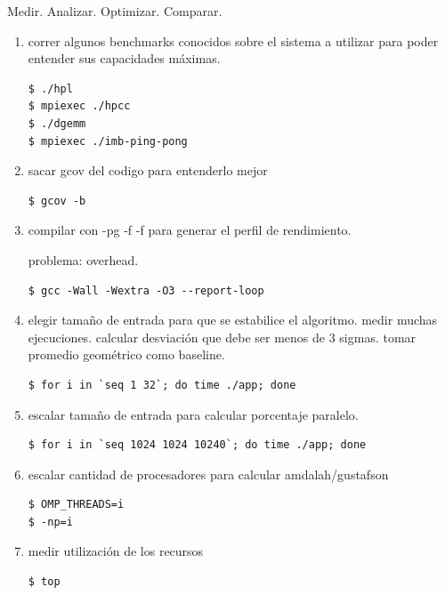 \documentclass[a4paper]{report}
\begin{document}
\bigskip

Medir. Analizar. Optimizar. Comparar.

\begin{enumerate}
\item correr algunos benchmarks conocidos sobre el sistema a utilizar para poder entender sus capacidades m\'aximas.

\begin{verbatim}
$ ./hpl
$ mpiexec ./hpcc
$ ./dgemm
$ mpiexec ./imb-ping-pong
\end{verbatim}

\item sacar gcov del codigo para entenderlo mejor

\begin{verbatim}
$ gcov -b
\end{verbatim}

\item compilar con -pg -f -f para generar el perfil de rendimiento.

problema: overhead.

\begin{verbatim}
$ gcc -Wall -Wextra -O3 --report-loop
\end{verbatim}

\item elegir tama\~no de entrada para que se estabilice el algoritmo.
	medir muchas ejecuciones. calcular desviaci\'on que debe ser menos de 3
	sigmas. tomar promedio geom\'etrico como baseline.
	
\begin{verbatim}
$ for i in `seq 1 32`; do time ./app; done
\end{verbatim}
	
\item escalar tama\~no de entrada para calcular porcentaje paralelo.

\begin{verbatim}
$ for i in `seq 1024 1024 10240`; do time ./app; done
\end{verbatim}

\item escalar cantidad de procesadores para calcular amdalah/gustafson

\begin{verbatim}
$ OMP_THREADS=i
$ -np=i
\end{verbatim}

\item medir utilizaci\'on de los recursos

\begin{verbatim}
$ top
\end{verbatim}


\end{enumerate}
\end{document}
